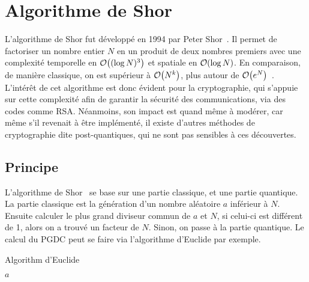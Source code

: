 \chapter{Algorithme de Shor}\label{ch:algorithme-de-shor}

L'algorithme de Shor fut développé en 1994 par Peter Shor~\cite{shor-article}.
Il permet de factoriser un nombre entier $N$ en un produit de deux nombres premiers avec
une complexité temporelle en $\order{(\log N)^3}$ et spatiale en $\order{\log N}$.
En comparaison, de manière classique, on est supérieur à $\order{N^k}$, plus autour
de $\order{e^{N}}$~\cite{wiki:int-fact}.
L'intérêt de cet algorithme est donc évident pour la cryptographie, qui s'appuie sur cette
complexité afin de garantir la sécurité des communications, via des codes comme RSA\@.
Néanmoins, son impact est quand même à modérer, car même s'il revenait à être implémenté,
il existe d'autres méthodes de cryptographie dite post-quantiques, qui ne sont pas sensibles
à ces découvertes.

\section{Principe}\label{sec:principe}

L'algorithme de Shor~\cite{wiki:shor} se base sur une partie classique, et une partie quantique.
La partie classique est la génération d'un nombre aléatoire $a$ inférieur à $N$.
Ensuite calculer le plus grand diviseur commun de $a$ et $N$, si celui-ci est différent de 1,
alors on a trouvé un facteur de $N$.
Sinon, on passe à la partie quantique.
Le calcul du PGDC peut se faire via l'algorithme d'Euclide par exemple.

\begin{algorithm}[H]
    \caption{Algorithm d'Euclide}
    \label{alg:euclide}

    \Retour $a$\;
\end{algorithm}

